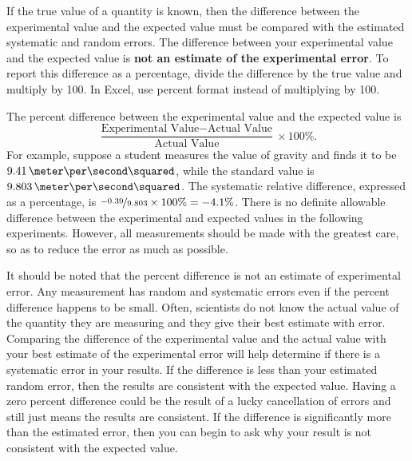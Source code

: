 
If the true value of a quantity is known, then the difference between the experimental value and the expected value must be compared with the estimated systematic and random errors.  The difference between your experimental value and the expected value is \textbf{not an estimate of the experimental error}. To report this difference as a percentage, divide the difference by the true value and multiply by 100. In Excel, use percent format instead of multiplying by 100.

The percent difference between the experimental value and the expected value is
\[
\frac{\mbox{Experimental Value} - \mbox{Actual Value}}{\mbox{Actual Value}} \times 100\%.
\]
For example, suppose a student measures the value of gravity and finds it to be $9.41\,\meter\per\second\squared$, while the standard value is $9.803\,\meter\per\second\squared$.
The systematic relative difference, expressed as a percentage, is $\nicefrac{-0.39}{9.803} \times 100\% = -4.1\%$.
There is no definite allowable difference between the experimental and expected values in the following experiments. However, all measurements should be made with the greatest care, so as to reduce the error as much as possible.

It should be noted that the percent difference is not an estimate of experimental error. Any measurement has random and systematic errors even if the percent difference happens to be small.  Often, scientists do not know the actual value of the quantity they are measuring and they give their best estimate with error. Comparing the difference of the experimental value and the actual value with your best estimate of the experimental error will help determine if there is a systematic error in your results. If the difference is less than your estimated random error, then the results are consistent with the expected value. Having a zero percent difference could be the result of a lucky cancellation of errors and still just means the results are consistent. If the difference is significantly more than the estimated error, then you can begin to ask why your result is not consistent with the expected value.

